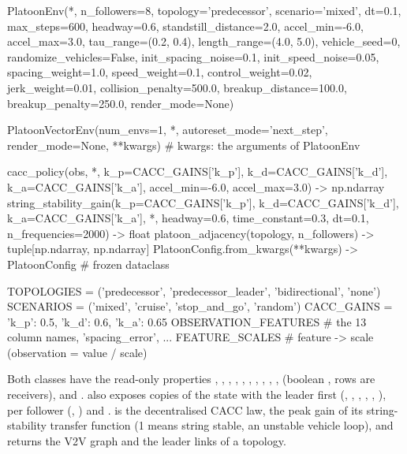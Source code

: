 \begin{pycode}
PlatoonEnv(*, n_followers=8, topology='predecessor', scenario='mixed', dt=0.1,
           max_steps=600, headway=0.6, standstill_distance=2.0, accel_min=-6.0,
           accel_max=3.0, tau_range=(0.2, 0.4), length_range=(4.0, 5.0),
           vehicle_seed=0, randomize_vehicles=False, init_spacing_noise=0.1,
           init_speed_noise=0.05, spacing_weight=1.0, speed_weight=0.1,
           control_weight=0.02, jerk_weight=0.01, collision_penalty=500.0,
           breakup_distance=100.0, breakup_penalty=250.0, render_mode=None)

PlatoonVectorEnv(num_envs=1, *, autoreset_mode='next_step', render_mode=None,
                 **kwargs)               # kwargs: the arguments of PlatoonEnv

cacc_policy(obs, *, k_p=CACC_GAINS['k_p'], k_d=CACC_GAINS['k_d'],
            k_a=CACC_GAINS['k_a'], accel_min=-6.0, accel_max=3.0) -> np.ndarray
string_stability_gain(k_p=CACC_GAINS['k_p'], k_d=CACC_GAINS['k_d'],
                      k_a=CACC_GAINS['k_a'], *, headway=0.6, time_constant=0.3,
                      dt=0.1, n_frequencies=2000) -> float
platoon_adjacency(topology, n_followers) -> tuple[np.ndarray, np.ndarray]
PlatoonConfig.from_kwargs(**kwargs) -> PlatoonConfig   # frozen dataclass

TOPOLOGIES = ('predecessor', 'predecessor_leader', 'bidirectional', 'none')
SCENARIOS = ('mixed', 'cruise', 'stop_and_go', 'random')
CACC_GAINS = {'k_p': 0.5, 'k_d': 0.6, 'k_a': 0.65}
OBSERVATION_FEATURES    # the 13 column names, 'spacing_error', ...
FEATURE_SCALES          # feature -> scale (observation = value / scale)
\end{pycode}

Both classes have the read-only properties ,
, , , ,
, , , ,
,  (boolean , rows are receivers),
  and .
 also exposes copies of the state with the leader first
(, , ,
, , ), per follower
(, ) and .
 is the decentralised CACC law, 
the peak gain of its string-stability transfer function (1 means string
stable,  an unstable vehicle loop), and 
returns the V2V graph and the leader links of a topology.

